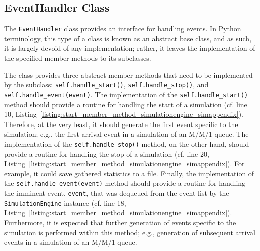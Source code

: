 \subsection{EventHandler Class}
\label{sub:eventhandler_class_simappendix}
The \lstinline{EventHandler} class provides an interface for handling events. In Python terminology, this type of a class is known as an abstract base class, and as such, it is largely devoid of any implementation; rather, it leaves the implementation of the specified member methods to its subclasses.

The class provides three abstract member methods that need to be implemented by the subclass: \lstinline{self.handle_start()}, \lstinline{self.handle_stop()}, and \lstinline{self.handle_event(event)}. The implementation of the \lstinline{self.handle_start()} method should provide a routine for handling the start of a simulation (cf. line 10, Listing~\ref{listing:start_member_method_simulationengine_simappendix}). Therefore, at the very least, it should generate the first event specific to the simulation; e.g., the first arrival event in a simulation of an M/M/1 queue. The implementation of the \lstinline{self.handle_stop()} method, on the other hand, should provide a routine for handling the stop of a simulation (cf. line 20, Listing~\ref{listing:start_member_method_simulationengine_simappendix}). For example, it could save gathered statistics to a file. Finally, the implementation of the \lstinline{self.handle_event(event)} method should provide a routine for handling the imminent event, \lstinline{event}, that was dequeued from the event list by the \lstinline{SimulationEngine} instance (cf. line 18, Listing~\ref{listing:start_member_method_simulationengine_simappendix}). Furthermore, it is expected that further generation of events specific to the simulation is performed within this method; e.g., generation of subsequent arrival events in a simulation of an M/M/1 queue.

